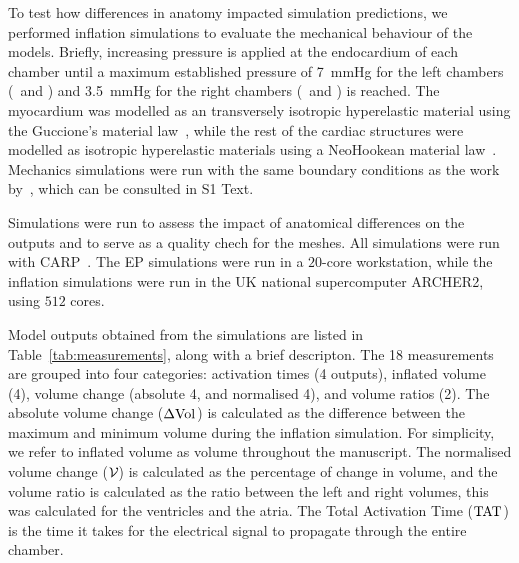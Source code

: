 To test how differences in anatomy impacted simulation predictions,
we performed inflation simulations to evaluate the mechanical behaviour of the models.
Briefly, increasing pressure is applied at the endocardium of each chamber until a 
maximum established pressure of  
7~mmHg for the left chambers (\LV\ and \LA) and
3.5~mmHg for the right chambers (\RV\ and \RA) 
is reached.
The myocardium was modelled as an transversely isotropic hyperelastic material using the 
Guccione's material law~\cite{Guccione-1991-material-props}, 
while the rest of the cardiac structures were modelled as isotropic hyperelastic materials using a 
NeoHookean material law~\cite{faulkner-1972-nearly}. 
Mechanics simulations were run with the same boundary conditions as the work by~\cite{strocchi2023_cell}, 
which can be consulted in S1 Text.

Simulations were run to assess the impact of anatomical differences on the outputs and to serve as 
a quality chech for the meshes. 
All simulations were run with CARP~\cite{carp-2003}. 
The EP simulations were run in a $20$-core workstation, 
while the inflation simulations were run in the UK national supercomputer ARCHER2, using $512$ cores.

Model outputs obtained from the simulations are listed in Table~\ref{tab:measurements},
along with a brief descripton. 
The 18 measurements are grouped into four categories:
activation times (4 outputs),
inflated volume (4),
volume change (absolute 4, and normalised 4), and
volume ratios (2).
The absolute volume change ($\Delta \mathrm{Vol}_{}$) is calculated as the difference between the maximum and minimum volume
during the inflation simulation.
For simplicity, we refer to inflated volume as volume throughout the manuscript.
The normalised volume change ($\mathcal{V}_{}$) is calculated as the percentage of change in volume,
and the volume ratio is calculated as the ratio between the left and right volumes, 
this was calculated for the ventricles and the atria. 
The Total Activation Time ($\mathrm{TAT}_{}$) is the time it takes for the electrical signal to propagate
through the entire chamber.


